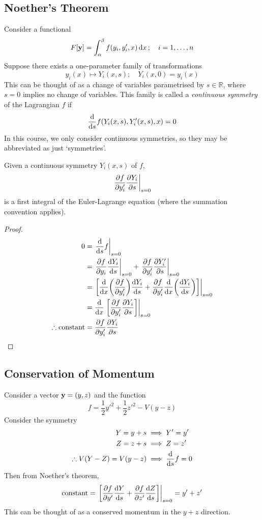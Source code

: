 \subsection{Noether's Theorem}
Consider a functional
\[ F[\vb y] = \int_\alpha^\beta f(y_i, y_i', x) \dd{x};\quad i = 1,\dots,n \]
Suppose there exists a one-parameter family of transformations
\[ y_i(x) \mapsto Y_i(x,s);\quad Y_i(x,0) = y_i(x) \]
This can be thought of as a change of variables parametrised by \( s \in \mathbb R \), where \( s = 0 \) implies no change of variables.
This family is called a \textit{continuous symmetry} of the Lagrangian \( f \) if
\[ \dv{s} f(Y_i(x,s), Y_i'(x,s), x) = 0 \]
In this course, we only consider continuous symmetries, so they may be abbreviated as just `symmetries'.
\begin{theorem}
    Given a continuous symmetry \( Y_i(x,s) \) of \( f \),
    \[ \eval{\pdv{f}{y_i'}\pdv{Y_i}{s}}_{s=0} \]
    is a first integral of the Euler-Lagrange equation (where the summation convention applies).
\end{theorem}
\begin{proof}
    \begin{align*}
        0 &= \eval{\dv{s} f}_{s=0} \\
        &= \eval{\pdv{f}{y_i} \dv{Y_i}{s}}_{s=0} + \eval{\pdv{f}{y_i'}\pdv{Y_i'}{s}}_{s=0} \\
        &= \eval{\qty[\dv{x} \qty(\pdv{f}{y_i'})\dv{Y_i}{s} + \pdv{f}{y_i'}\dv{x}\qty(\dv{Y_i}{s})]}_{s=0} \\
        &= \dv{x}\eval{\qty[\pdv{f}{y_i'}\pdv{Y_i}{s}]}_{s=0} \\
        \therefore \text{constant} &= \pdv{f}{y_i'}\pdv{Y_i}{s}
    \end{align*}
\end{proof}

\subsection{Conservation of Momentum}
\begin{example}
    Consider a vector \( \vb y = (y,z) \) and the function
    \[ f = \frac{1}{2}y'^2 + \frac{1}{2}z'^2 - V(y-z) \]
    Consider the symmetry
    \begin{align*}
        Y = y + s &\implies Y' = y' \\
        Z = z + s & \implies Z = z' \\
        \therefore V(Y-Z) = V(y-z) &\implies \dv{s} f = 0
    \end{align*}
    Then from Noether's theorem,
    \[ \text{constant} = \eval{\qty[\pdv{f}{y'}\dv{Y}{s} + \pdv{f}{z'}\dv{Z}{s}]}_{s=0} = y' + z' \]
    This can be thought of as a conserved momentum in the \(y+z\) direction.
\end{example}

